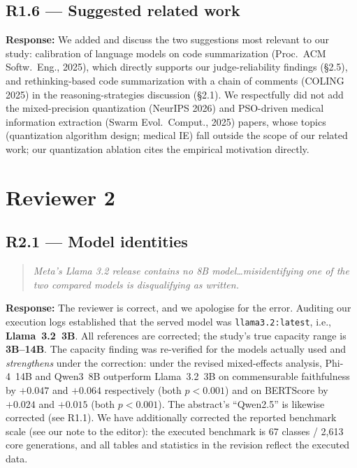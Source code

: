 \documentclass[11pt]{article}
\newcommand{\rcomment}[1]{\begin{quote}\itshape\color{black!70}#1\end{quote}}
\newcommand{\resp}{\noindent\textbf{Response:} }
\begin{document}
\subsection*{R1.6 --- Suggested related work}
\resp We added and discuss the two suggestions most relevant to our study: calibration of language models on code summarization (Proc.\ ACM Softw.\ Eng., 2025), which directly supports our judge-reliability findings (\S2.5), and rethinking-based code summarization with a chain of comments (COLING 2025) in the reasoning-strategies discussion (\S2.1). We respectfully did not add the mixed-precision quantization (NeurIPS 2026) and PSO-driven medical information extraction (Swarm Evol.\ Comput., 2025) papers, whose topics (quantization algorithm design; medical IE) fall outside the scope of our related work; our quantization ablation cites the empirical motivation directly.

\section{Reviewer 2}

\subsection*{R2.1 --- Model identities}
\rcomment{Meta's Llama 3.2 release contains no 8B model\dots misidentifying one of the two compared models is disqualifying as written.}
\resp The reviewer is correct, and we apologise for the error. Auditing our execution logs established that the served model was \texttt{llama3.2:latest}, i.e., \textbf{Llama~3.2~3B}. All references are corrected; the study's true capacity range is \textbf{3B--14B}. The capacity finding was re-verified for the models actually used and \emph{strengthens} under the correction: under the revised mixed-effects analysis, Phi-4~14B and Qwen3~8B outperform Llama~3.2~3B on commensurable faithfulness by $+0.047$ and $+0.064$ respectively (both $p<0.001$) and on BERTScore by $+0.024$ and $+0.015$ (both $p<0.001$). The abstract's ``Qwen2.5'' is likewise corrected (see R1.1). We have additionally corrected the reported benchmark scale (see our note to the editor): the executed benchmark is 67 classes / 2{,}613 core generations, and all tables and statistics in the revision reflect the executed data.
\end{document}
